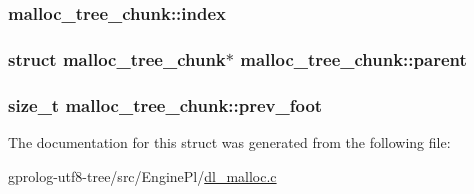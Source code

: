 \subsubsection[{\texorpdfstring{index}{index}}]{ malloc\+\_\+tree\+\_\+chunk\+::index}\hypertarget{structmalloc__tree__chunk_a3015f2a8d6cc5cdb7abaf34e902c46a4}{}\label{structmalloc__tree__chunk_a3015f2a8d6cc5cdb7abaf34e902c46a4}
\subsubsection[{\texorpdfstring{parent}{parent}}]{\setlength{\rightskip}{0pt plus 5cm}struct {\bf malloc\+\_\+tree\+\_\+chunk}$\ast$ malloc\+\_\+tree\+\_\+chunk\+::parent}\hypertarget{structmalloc__tree__chunk_ae15ae9af5d9c57488718f0649868b7fe}{}\label{structmalloc__tree__chunk_ae15ae9af5d9c57488718f0649868b7fe}
\subsubsection[{\texorpdfstring{prev\+\_\+foot}{prev_foot}}]{\setlength{\rightskip}{0pt plus 5cm}size\+\_\+t malloc\+\_\+tree\+\_\+chunk\+::prev\+\_\+foot}\hypertarget{structmalloc__tree__chunk_a0b7e321702857b18f5013a3182b99262}{}\label{structmalloc__tree__chunk_a0b7e321702857b18f5013a3182b99262}


The documentation for this struct was generated from the following file\+:\begin{DoxyCompactItemize}
\item 
gprolog-\/utf8-\/tree/src/\+Engine\+Pl/\hyperlink{dl__malloc_8c}{dl\+\_\+malloc.\+c}\end{DoxyCompactItemize}
